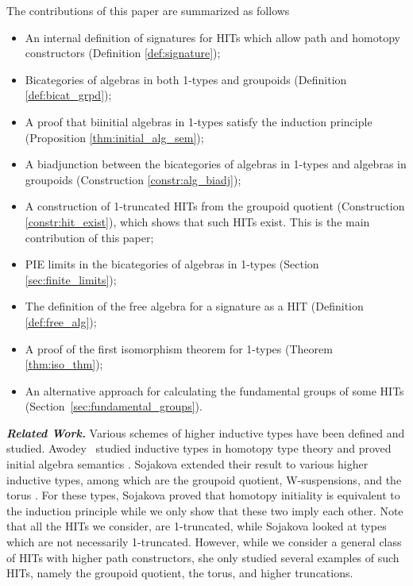 The contributions of this paper are summarized as follows
\begin{itemize}
	\item An internal definition of signatures for HITs which allow path and homotopy constructors (Definition \ref{def:signature});
	\item Bicategories of algebras in both 1-types and groupoids (Definition \ref{def:bicat_grpd});
	\item A proof that biinitial algebras in 1-types satisfy the induction principle (Proposition \ref{thm:initial_alg_sem});
	\item A biadjunction between the bicategories of algebras in 1-types and algebras in groupoids (Construction \ref{constr:alg_biadj});
	\item A construction of 1-truncated HITs from the groupoid quotient (Construction \ref{constr:hit_exist}),
	which shows that such HITs exist.
	This is the main contribution of this paper;
        \item PIE limits in the bicategories of algebras in 1-types (Section \ref{sec:finite_limits});
        \item The definition of the free algebra for a signature as a HIT (Definition \ref{def:free_alg});
        \item A proof of the first isomorphism theorem for 1-types (Theorem \ref{thm:iso_thm});
        \item An alternative approach for calculating the fundamental groups of some HITs (Section~\ref{sec:fundamental_groups}).
\end{itemize}
\emph{\textbf{Related Work.}}
Various schemes of higher inductive types have been defined and studied.
Awodey \etal \ studied inductive types in homotopy type theory and proved initial
algebra semantics \cite{AwodeyGS12}.
Sojakova extended their result to various higher inductive types, among which
are the groupoid quotient, W-suspensions, and the torus \cite{Sojakova15,sojakovaPhD}.
For these types, Sojakova proved that homotopy initiality is equivalent to the induction principle while we only show that these two imply each other.
Note that all the HITs we consider, are 1-truncated, while Sojakova looked at types which are not necessarily 1-truncated.
However, while we consider a general class of HITs with higher path constructors, she only studied several examples of such HITs, namely the groupoid quotient, the torus, and higher truncations.
